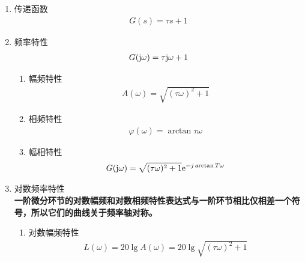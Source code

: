 \begin{enumerate}[1.]
	\item 传递函数
	\vspace*{-0.5em}
	\begin{align}
		G(s) = \tau s + 1
	\end{align}
	\vspace*{-3em}
	
	\item 频率特性
	\vspace*{-0.5em}
	\begin{align}
		G(\text{j}  \omega) = \tau \text{j} \omega + 1
	\end{align}
	\vspace*{-3em}
	\begin{enumerate}[(1) ]
		\item 幅频特性
		\vspace*{-0.5em}
		\begin{align}
			A(\omega) = \sqrt{(\tau \omega)^2 + 1}
		\end{align}
		\vspace*{-3em}
		
		\item 相频特性
		\begin{align}
			\varphi(\omega) = \arctan \tau \omega
		\end{align}
		\vspace*{-3em}
		
		\item 幅相特性
		\vspace*{-0.5em}
		\begin{align}
			G(\text{j} \omega) = \sqrt{(\tau \omega)^2 + 1}{\rm{e}}^{-j  \arctan T\omega}
		\end{align}
		\vspace*{-3em}
		
	\end{enumerate}
	\item 对数频率特性\\
	\textbf{一阶微分环节的对数幅频和对数相频特性表达式与一阶环节相比仅相差一个符号，所以它们的曲线关于频率轴对称。}
	\begin{enumerate}[(1) ]
		\item 对数幅频特性
		\vspace*{-0.5em}
		\begin{align}
			L(\omega) = 20 \lg A(\omega) = 20 \lg \sqrt{(\tau \omega)^2 + 1}
		\end{align}
		

\end{enumerate}
\end{enumerate}
